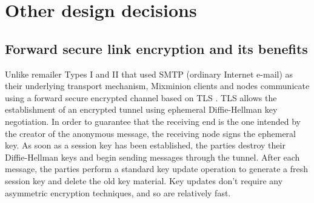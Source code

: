 \documentclass[final]{ieee}
\begin{document}
\section{Other design decisions}


\subsection{Forward secure link encryption and its benefits}
\label{subsec:link-encrypt}

Unlike remailer Types I and II that used SMTP \cite{SMTP} (ordinary
Internet e-mail) as their underlying transport mechanism, Mixminion
clients and nodes communicate using a forward secure encrypted channel
based on TLS \cite{TLS}.  
TLS allows the establishment of an encrypted tunnel using ephemeral
Diffie-Hellman key negotiation. In order to guarantee that the receiving end is
the one intended by the creator of the anonymous message, the
receiving node signs the ephemeral key. As soon as a session key
has been established, the parties destroy their Diffie-Hellman keys
and begin sending messages through the tunnel. After each message, the
parties perform a standard key update operation to generate a fresh
session key and delete the old key material.  Key updates don't require any
asymmetric encryption techniques, and so are relatively fast.

%


%
\end{document}

